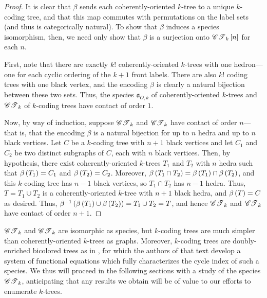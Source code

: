 \documentclass[sectionflow,singlespace,twoside,boldmathhdr]{brandiss} %
\numberwithin{section}{chapter}
\numberwithin{figure}{chapter}
\begin{document}
\begin{proof}
  It is clear that $\beta$ sends each coherently-oriented $k$-tree to a unique $k$-coding tree, and that this map commutes with permutations on the label sets (and thus is categorically natural).
  To show that $\beta$ induces a species isomorphism, then, we need only show that $\beta$ is a surjection onto $\mathscr{CT}_{k} \left[ {n} \right]$ for each $n$.
  
  First, note that there are exactly $k!$ coherently-oriented $k$-trees with one hedron---one for each cyclic ordering of the $k+1$ front labels.
  There are also $k!$ coding trees with one black vertex, and the encoding $\beta$ is clearly a natural bijection between these two sets.
  Thus, the species $\mathfrak{a}_{O,k}$ of coherently-oriented $k$-trees and $\mathscr{CT}_{k}$ of $k$-coding trees have contact of order $1$.

  Now, by way of induction, suppose $\mathscr{CT}_{k}$ and $\mathscr{CT}_{k}$ have contact of order $n$---that is, that the encoding $\beta$ is a natural bijection for up to $n$ hedra and up to $n$ black vertices.
  Let $C$ be a $k$-coding tree with $n+1$ black vertices and let $C_{1}$ and $C_{2}$ be two distinct subgraphs of $C$, each with $n$ black vertices.
  Then, by hypothesis, there exist coherently-oriented $k$-trees $T_{1}$ and $T_{2}$ with $n$ hedra such that $\beta \left( {T_{1}} \right) = C_{1}$ and $\beta \left( {T_{2}} \right) = C_{2}$.
  Moreover, $\beta \left( {T_{1} \cap T_{2}} \right) = \beta \left( {T_{1}} \right) \cap \beta \left( {T_{2}} \right)$, and this $k$-coding tree has $n-1$ black vertices, so $T_{1} \cap T_{2}$ has $n-1$ hedra.
  Thus, $T = T_{1} \cup T_{2}$ is a coherently-oriented $k$-tree with $n+1$ black hedra, and $\beta \left( {T} \right) = C$ as desired.
  Thus, $\beta^{-1} \left( {\beta \left( {T_{1}} \right) \cup \beta \left( {T_{2}} \right)} \right) = T_{1} \cup T_{2} = T$, and hence $\mathscr{CT}_{k}$ and $\mathscr{CT}_{k}$ have contact of order $n+1$.
\end{proof}

$\mathscr{CT}_{k}$ and $\mathscr{CT}_{k}$ are isomorphic as species, but $k$-coding trees are much simpler than coherently-oriented $k$-trees as graphs.
Moreover, $k$-coding trees are doubly-enriched bicolored trees as in \cite[\S 3.2]{bll:species}, for which the authors of that text develop a system of functional equations which fully characterizes the cycle index of such a species.
We thus will proceed in the following sections with a study of the species $\mathscr{CT}_{k}$, anticipating that any results we obtain will be of value to our efforts to enumerate $k$-trees.
\end{document}
